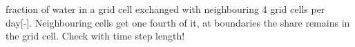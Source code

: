 fraction of water in a grid cell exchanged with neighbouring 4 grid cells per day\mbox{[}-\/\mbox{]}. Neighbouring cells get one fourth of it, at boundaries the share remains in the grid cell. Check with time step length! 